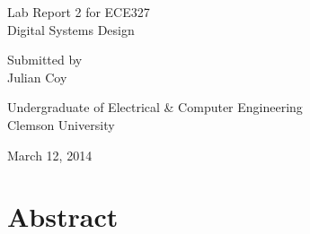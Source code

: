 \documentclass[11pt]{report}
\begin{document}
\begin{spacing}{1.5}

\thispagestyle{empty}

\begin{scshape}

\vspace*{30pt}
{
\Huge
\begin{center}
    \reporttitle
\end{center}
}
\vspace{30pt}

{
\Large
\begin{center}
  Lab Report 2 for ECE327 \\
  Digital Systems Design
\end{center}
}
\vspace{30pt}
{
\Large 
\begin{center}
  Submitted by \\
  Julian Coy
\end{center}
}
\vspace{120pt}

{
\Large
\begin{center}
  Undergraduate of Electrical \& Computer Engineering \\
  Clemson University
\end{center}
}
\vspace{30pt}

{
\Large
\begin{center}
  March 12, 2014
\end{center}
}

\end{scshape}

\clearpage


\vspace{15pt}
  \setcounter{chapter}{1}
  \chapter*{Abstract}
  \label{cha:abstract}
\vspace{72pt}


\end{spacing}
\end{document}
